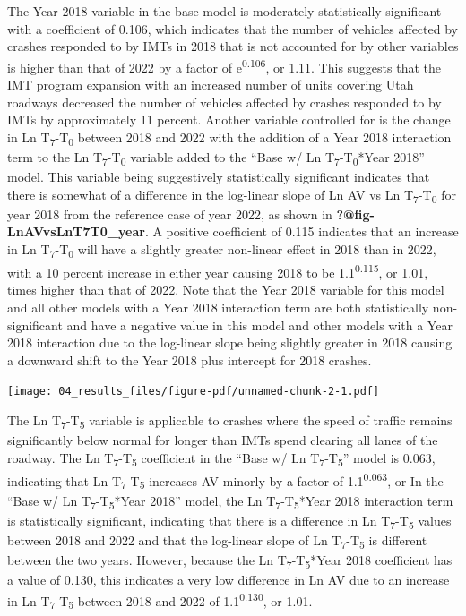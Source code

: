 \documentclass[
  letterpaper,
  authoryear]{elsarticle}
\begin{document}
The Year 2018 variable in the base model is moderately statistically
significant with a coefficient of 0.106, which indicates that the number
of vehicles affected by crashes responded to by IMTs in 2018 that is not
accounted for by other variables is higher than that of 2022 by a factor
of e\textsuperscript{0.106}, or 1.11. This suggests that the IMT program
expansion with an increased number of units covering Utah roadways
decreased the number of vehicles affected by crashes responded to by
IMTs by approximately 11 percent. Another variable controlled for is the
change in Ln T\textsubscript{7}-T\textsubscript{0} between 2018 and 2022
with the addition of a Year 2018 interaction term to the Ln
T\textsubscript{7}-T\textsubscript{0} variable added to the ``Base w/ Ln
T\textsubscript{7}-T\textsubscript{0}*Year 2018'' model. This variable
being suggestively statistically significant indicates that there is
somewhat of a difference in the log-linear slope of Ln AV vs Ln
T\textsubscript{7}-T\textsubscript{0} for year 2018 from the reference
case of year 2022, as shown in \textbf{?@fig-LnAVvsLnT7T0\_year}. A
positive coefficient of 0.115 indicates that an increase in Ln
T\textsubscript{7}-T\textsubscript{0} will have a slightly greater
non-linear effect in 2018 than in 2022, with a 10 percent increase in
either year causing 2018 to be 1.1\textsuperscript{0.115}, or 1.01,
times higher than that of 2022. Note that the Year 2018 variable for
this model and all other models with a Year 2018 interaction term are
both statistically non-significant and have a negative value in this
model and other models with a Year 2018 interaction due to the
log-linear slope being slightly greater in 2018 causing a downward shift
to the Year 2018 plus intercept for 2018 crashes.

\texttt{[image: 04\_results\_files/figure-pdf/unnamed-chunk-2-1.pdf]}

The Ln T\textsubscript{7}-T\textsubscript{5} variable is applicable to
crashes where the speed of traffic remains significantly below normal
for longer than IMTs spend clearing all lanes of the roadway. The Ln
T\textsubscript{7}-T\textsubscript{5} coefficient in the ``Base w/ Ln
T\textsubscript{7}-T\textsubscript{5}'' model is 0.063, indicating that
Ln T\textsubscript{7}-T\textsubscript{5} increases AV minorly by a
factor of 1.1\textsuperscript{0.063}, or In the ``Base w/ Ln
T\textsubscript{7}-T\textsubscript{5}*Year 2018'' model, the Ln
T\textsubscript{7}-T\textsubscript{5}*Year 2018 interaction term is
statistically significant, indicating that there is a difference in Ln
T\textsubscript{7}-T\textsubscript{5} values between 2018 and 2022 and
that the log-linear slope of Ln T\textsubscript{7}-T\textsubscript{5} is
different between the two years. However, because the Ln
T\textsubscript{7}-T\textsubscript{5}*Year 2018 coefficient has a value
of 0.130, this indicates a very low difference in Ln AV due to an
increase in Ln T\textsubscript{7}-T\textsubscript{5} between 2018 and
2022 of 1.1\textsuperscript{0.130}, or 1.01.
\end{document}
